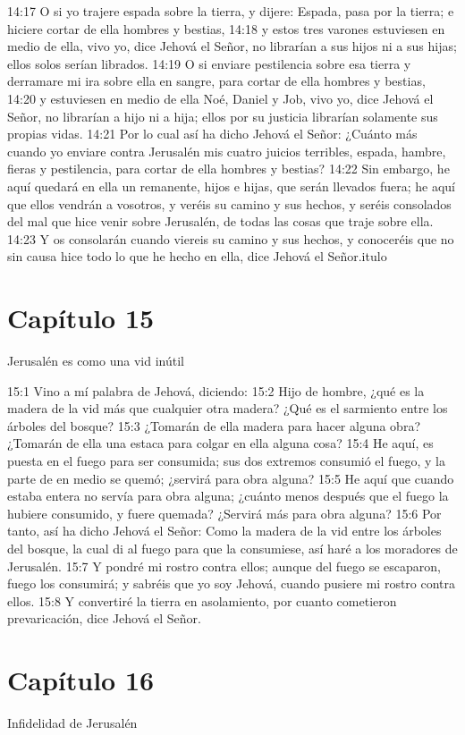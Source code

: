 14:17 O si yo trajere espada sobre la tierra, y dijere: Espada, pasa por la tierra; e hiciere cortar de ella hombres y bestias, 
14:18 y estos tres varones estuviesen en medio de ella, vivo yo, dice Jehová el Señor, no librarían a sus hijos ni a sus hijas; ellos solos serían librados.   
14:19 O si enviare pestilencia sobre esa tierra y derramare mi ira sobre ella en sangre, para cortar de ella hombres y bestias,   
14:20 y estuviesen en medio de ella Noé, Daniel y Job, vivo yo, dice Jehová el Señor, no librarían a hijo ni a hija; ellos por su justicia librarían solamente sus propias vidas.   
14:21 Por lo cual así ha dicho Jehová el Señor: ¿Cuánto más cuando yo enviare contra Jerusalén mis cuatro juicios terribles, espada, hambre, fieras y pestilencia,  para cortar de ella hombres y bestias?   
14:22 Sin embargo, he aquí quedará en ella un remanente, hijos e hijas, que serán llevados fuera; he aquí que ellos vendrán a vosotros, y veréis su camino y sus hechos, y seréis consolados del mal que hice venir sobre Jerusalén, de todas las cosas que traje sobre ella.   
14:23 Y os consolarán cuando viereis su camino y sus hechos, y conoceréis que no sin causa hice todo lo que he hecho en ella, dice Jehová el Señor.itulo   
\section*{Capítulo 15 } 
Jerusalén es como una vid inútil   
  
15:1 Vino a mí palabra de Jehová, diciendo:   
15:2 Hijo de hombre, ¿qué es la madera de la vid más que cualquier otra madera? ¿Qué es el sarmiento entre los árboles del bosque?   
15:3 ¿Tomarán de ella madera para hacer alguna obra? ¿Tomarán de ella una estaca para colgar en ella alguna cosa?   
15:4 He aquí, es puesta en el fuego para ser consumida; sus dos extremos consumió el fuego, y la parte de en medio se quemó; ¿servirá para obra alguna?   
15:5 He aquí que cuando estaba entera no servía para obra alguna; ¿cuánto menos después que el fuego la hubiere consumido, y fuere quemada? ¿Servirá más para obra alguna?   
15:6 Por tanto, así ha dicho Jehová el Señor: Como la madera de la vid entre los árboles del bosque, la cual di al fuego para que la consumiese, así haré a los moradores de Jerusalén.   
15:7 Y pondré mi rostro contra ellos; aunque del fuego se escaparon, fuego los consumirá; y sabréis que yo soy Jehová, cuando pusiere mi rostro contra ellos.   
15:8 Y convertiré la tierra en asolamiento, por cuanto cometieron prevaricación, dice Jehová el Señor.   
\section*{Capítulo 16} 
Infidelidad de Jerusalén   
  
